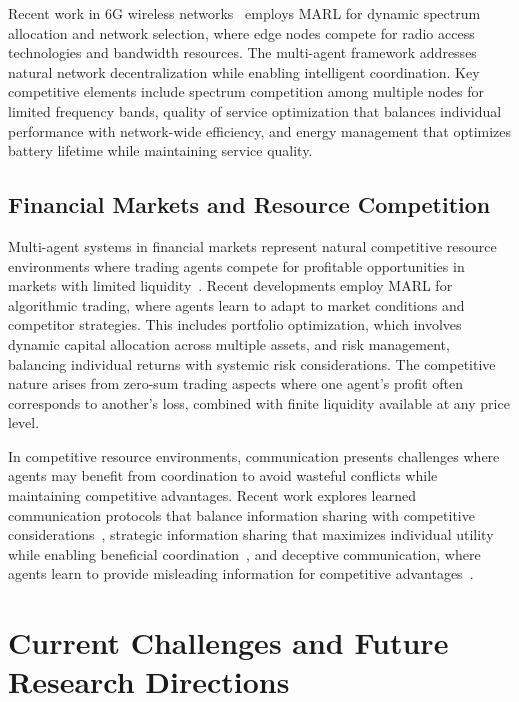 Recent work in 6G wireless networks~\autocite{zhang_multi-agent_2025} employs MARL for dynamic spectrum allocation and network selection, where edge nodes compete for radio access technologies and bandwidth resources. The multi-agent framework addresses natural network decentralization while enabling intelligent coordination. Key competitive elements include spectrum competition among multiple nodes for limited frequency bands, quality of service optimization that balances individual performance with network-wide efficiency, and energy management that optimizes battery lifetime while maintaining service quality.

\subsection{Financial Markets and Resource Competition}

Multi-agent systems in financial markets represent natural competitive resource environments where trading agents compete for profitable opportunities in markets with limited liquidity~\autocite{shavandi_multi-agent_2022}. Recent developments employ MARL for algorithmic trading, where agents learn to adapt to market conditions and competitor strategies. This includes portfolio optimization, which involves dynamic capital allocation across multiple assets, and risk management, balancing individual returns with systemic risk considerations. The competitive nature arises from zero-sum trading aspects where one agent's profit often corresponds to another's loss, combined with finite liquidity available at any price level.

In competitive resource environments, communication presents challenges where agents may benefit from coordination to avoid wasteful conflicts while maintaining competitive advantages. Recent work explores learned communication protocols that balance information sharing with competitive considerations~\autocite{foerster_learning_2016}, strategic information sharing that maximizes individual utility while enabling beneficial coordination~\autocite{eccles_biases_2019}, and deceptive communication, where agents learn to provide misleading information for competitive advantages~\autocite{cao_emergent_2018}.

\section{Current Challenges and Future Research Directions}

